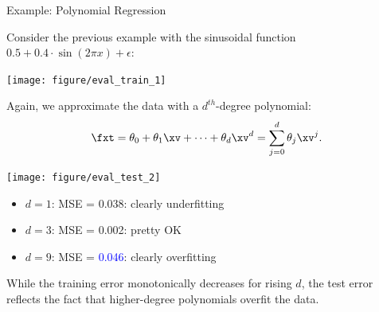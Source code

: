 \documentclass[11pt,compress,t,notes=noshow, xcolor=table]{beamer}
\begin{document}

% 
% 


\begin{vbframe}{Example: Polynomial Regression}

Consider the previous example with the sinusoidal function
$0.5 + 0.4 \cdot \sin (2 \pi x) + \epsilon$:

\vfill

\begin{center}
  \texttt{[image: figure/eval\_train\_1]}
\end{center}

Again, we approximate the data with a $d^{th}$-degree polynomial:
\[ \fxt = \theta_0 + \theta_1 \xv + \cdots + \theta_d \xv^d = \sum_{j = 0}^{d}
\theta_j \xv^j\text. \]

\framebreak

\texttt{[image: figure/eval\_test\_2]} 

\begin{itemize}
  \footnotesize
  \item $d = 1$: MSE = 0.038: clearly underfitting
  \item $d = 3$: MSE = 0.002: pretty OK
  \item $d = 9$: MSE = \textcolor{blue}{0.046}: clearly overfitting
\end{itemize}

\vfill

While the training error monotonically decreases for rising $d$, 
the test error reflects the fact that higher-degree polynomials overfit 
the data.

\end{vbframe}

\end{document}
